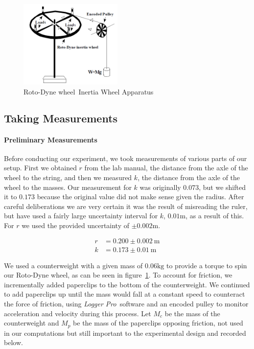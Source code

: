 \documentclass[coverpage]{article}
\newcommand{\softwareText}[1]{\textit{#1}\texttrademark}
\newcommand{\loggerpro}{\softwareText{Logger Pro}}
\newcommand{\rwheel}{Roto-Dyne wheel}
\begin{document}
	\begin{figure}
		\caption{\rwheel~Inertia Wheel Apparatus
		\label{fig:apparatus}
		\cite{labManual}}
		\centering
		\includegraphics[width=2in]{graphics/apparatus.png}
	\end{figure}

	\subsection{Taking Measurements}
	
	\paragraph{Preliminary Measurements}
	Before conducting our experiment, we took measurements of various parts of our setup. First we obtained $r$ from the lab manual, the distance from the axle of the wheel to the string, and then we measured $k$, the distance from the axle of the wheel to the masses. Our measurement for $k$ was originally $0.073$, but we shifted it to $0.173$ because the original value did not make sense given the radius. After careful deliberations we are very certain it was the result of misreading the ruler, but have used a fairly large uncertainty interval for $k$, $0.01 \text{m}$, as a result of this. For $r$ we used the provided uncertainty of $\pm 0.002 \text{m}$.
	
	\begin{align}
		r&=0.200 \pm 0.002\ \text{m} \label{eq:def-r} \\
		k&=0.173 \pm 0.01\ \text{m} \label{eq:def-k}
	\end{align}

	We used a counterweight with a given mass of $0.06\text{kg}$ to provide a torque to spin our \rwheel, as can be seen in figure~\ref{fig:apparatus}. To account for friction, we incrementally added paperclips to the bottom of the counterweight. We continued to add paperclips up until the mass would fall at a constant speed to counteract the force of friction, using \loggerpro~software and an encoded pulley to monitor acceleration and velocity during this process. Let $M_c$ be the mass of the counterweight and $M_p$ be the mass of the paperclips opposing friction, not used in our computations but still important to the experimental design and recorded below.
	
\end{document}
